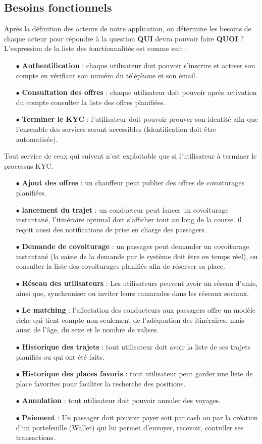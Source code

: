 \subsection{Besoins fonctionnels} %
\label{sub:besoins_fonctionnels}
Après la définition des acteurs de notre application, on détermine les besoins de chaque acteur pour répondre à la question \textbf{QUI} devra pouvoir faire \textbf{QUOI} ?\newline
L'expression de la liste des fonctionnalités est comme suit :
\begin{itemize}
	\item[$\bullet$] \textbf{Authentification} : chaque utilisateur doit pouvoir s'inscrire et activer son compte en vérifiant son numéro du téléphone et son émail.
	\item[$\bullet$] \textbf{Consultation des offres} : chaque utilisateur doit pouvoir après activation du compte consulter la liste des offres planifiées.
	\item[$\bullet$] \textbf{Terminer le KYC} : l'utilisateur doit pouvoir prouver son identité afin que l’ensemble des services seront accessibles (Identification doit être automatisée).
\end{itemize}
Tout service de ceux qui suivent n'est exploitable que si l'utilisateur à terminer le processus KYC.
\begin{itemize}
	\item[$\bullet$] \textbf{Ajout des offres} : un chauffeur peut publier des offres de covoiturages planifiées.
	\item[$\bullet$] \textbf{lancement du trajet} : un conducteur peut lancer un covoiturage instantané, l’itinéraire optimal doit s’afficher tout au long de la course. il reçoit aussi des notifications de prise en charge des passagers.
	\item[$\bullet$] \textbf{Demande de covoiturage} : un passager peut demander un covoiturage instantané (la saisie de la demande par le système doit être en temps réel), ou consulter la liste des covoiturages planifiés afin de réserver sa place.
	\item[$\bullet$] \textbf{Réseau des utilisateurs} : Les utilisateurs peuvent avoir un réseau d'amis, ainsi que, synchroniser ou inviter leurs camarades dans les réseaux sociaux.
	\item[$\bullet$] \textbf{Le matching} : l'affectation des conducteurs aux passagers offre un modèle riche qui tient compte non seulement de l'adéquation des itinéraires, mais aussi de l'âge, du sexe et le nombre de valises.
	\item[$\bullet$] \textbf{Historique des trajets} : tout utilisateur doit avoir la liste de ses trajets planifiés ou qui ont été faits.
	\item[$\bullet$] \textbf{Historique des places favoris} : tout utilisateur peut garder une liste de place favorites pour faciliter la recherche des positions.
	\item[$\bullet$] \textbf{Annulation} : tout utilisateur doit pouvoir annuler des voyages.
	\item[$\bullet$] \textbf{Paiement} : Un passager doit pouvoir payer soit par cash ou par la création d'un portefeuille (Wallet) qui lui permet d'envoyer, recevoir, contrôler ses transactions.
\end{itemize}
